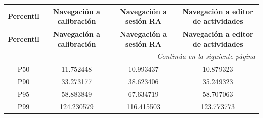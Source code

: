 \begin{longtable}{@{}cccc@{}}

\toprule
\textbf{Percentil} &
\textbf{Navegación a calibración} &
\textbf{Navegación a sesión RA} &
\textbf{Navegación a editor de actividades} \\
\toprule
\endfirsthead

\toprule
\textbf{Percentil} &
\textbf{Navegación a calibración} &
\textbf{Navegación a sesión RA} &
\textbf{Navegación a editor de actividades} \\
\toprule
\endhead

\midrule[\heavyrulewidth]
\multicolumn{4}{r}{\textit{Continúa en la siguiente página}}\\
\endfoot

\bottomrule
\endlastfoot

P50 & 11.752448 & 10.993437 & 10.879323 \\
P90 & 33.273177 & 38.623406 & 35.249323 \\
P95 & 58.883849 & 67.634719 & 58.707063 \\
P99 & 124.230579 & 116.415503 & 123.773773 \\

\end{longtable}